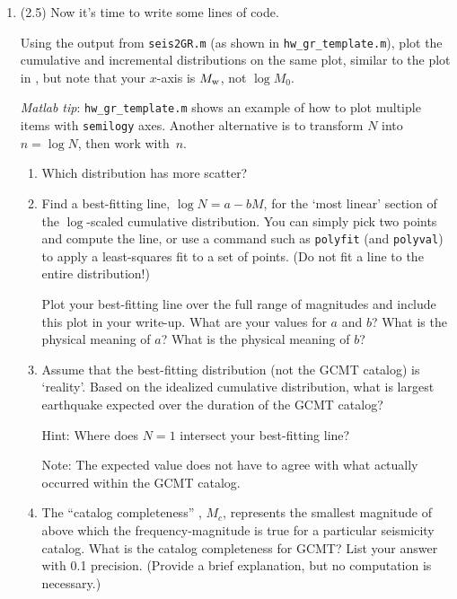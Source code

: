 \documentclass[11pt,titlepage,fleqn]{article}
\begin{document}
\begin{enumerate}

\item (2.5) Now it's time to write some lines of code.

Using the output from \verb+seis2GR.m+ (as shown in \verb+hw_gr_template.m+), plot the cumulative and incremental distributions on the same plot, similar to the plot in \citet[][Figure~4.7-2]{SteinWysession}, but note that your $x$-axis is $M_{\rm w}$, not $\log M_0$.

{\em Matlab tip}: \verb+hw_gr_template.m+ shows an example of how to plot multiple items with \verb+semilogy+ axes. Another alternative is to transform $N$ into $n = \log N$, then work with~$n$.

\begin{enumerate}
\item Which distribution has more scatter?

\item Find a best-fitting line, $\log N = a - b M$, for the `most linear' section of the $\log$-scaled cumulative distribution. You can simply pick two points and compute the line, or use a command such as \verb+polyfit+ (and \verb+polyval+) to apply a least-squares fit to a set of points. (Do not fit a line to the entire distribution!)

Plot your best-fitting line over the full range of magnitudes and include this plot in your write-up. What are your values for $a$ and $b$? What is the physical meaning of $a$? What is the physical meaning of $b$?

\item Assume that the best-fitting distribution (not the GCMT catalog) is `reality'. Based on the idealized cumulative distribution, what is largest earthquake expected over the duration of the GCMT catalog? 

Hint: Where does $N = 1$ intersect your best-fitting line?

Note: The expected value does not have to agree with what actually occurred within the GCMT catalog.

\item The ``catalog completeness'' \citep[\eg][]{WiemerWyss2000}, $M_c$, represents the smallest magnitude of above which the frequency-magnitude is true for a particular seismicity catalog. What is the catalog completeness for GCMT? List your answer with 0.1 precision. (Provide a brief explanation, but no computation is necessary.)

\end{enumerate}


\end{enumerate}
\end{document}
